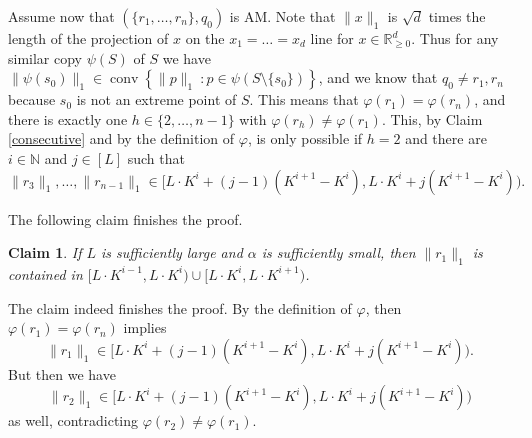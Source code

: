 \documentclass[12pt]{article}
\newcommand{\setbuilder}[2]{\left\{#1\ \colon #2\right\}}
\DeclareMathOperator{\conv}{conv}
\theoremstyle{plain}
\newtheorem{claim}[theorem]{Claim}
\theoremstyle{definition}
\begin{document}
Assume now that $(\{r_1,\dots,r_n\},q_0)$ is AM. Note that $\|x\|_1$ is $\sqrt{d}$ times the length of the projection of $x$ on the $x_1=\dots=x_d$ line for $x\in \mathbb{R}_{\geq 0}^d$. Thus for any similar copy $\psi(S)$ of $S$ we have $\|\psi(s_0)\|_1\in \conv \setbuilder{\|p\|_1}{p\in \psi(S\setminus\{s_0\})}$, and we know that $q_0\neq r_1,r_n$ because $s_0$ is not an extreme point of $S$. This means that $\varphi(r_1)=\varphi(r_n)$, and there is exactly one $h\in \{2,\dots,n-1\}$ with $\varphi(r_h)\neq \varphi(r_1)$. %
This, by Claim \ref{consecutive} and by the definition of $\varphi$, is only possible if $h=2$ and there are $i\in \mathbb{N}$ and $j\in [L]$ such that 
\[\|r_3\|_1,\dots,\|r_{n-1}\|_1\in [L\cdot K^i+(j-1)(K^{i+1}-K^i),L\cdot K^i+j(K^{i+1}-K^i)).\] 



The following claim finishes the proof.
\begin{claim}\label{r1}
If $L$ is sufficiently large and $\alpha$ is sufficiently small, then $\|r_1\|_1$ is contained in $[L\cdot K^{i-1}, L\cdot K^i)\cup [L\cdot K^{i}, L\cdot K^{i+1})$.
\end{claim}

The claim indeed finishes the proof. By the definition of $\varphi$, then $\varphi(r_1)=\varphi(r_n)$ implies \[\|r_1\|_1 \in [L\cdot K^i+(j-1)(K^{i+1}-K^i),L\cdot K^i+j(K^{i+1}-K^i)).\] But then we have \[\|r_2\|_1\in [L\cdot K^i+(j-1)(K^{i+1}-K^i),L\cdot K^i+j(K^{i+1}-K^i))\] as well, contradicting $\varphi(r_2)\neq \varphi(r_1)$.


\medskip 
\end{document}
